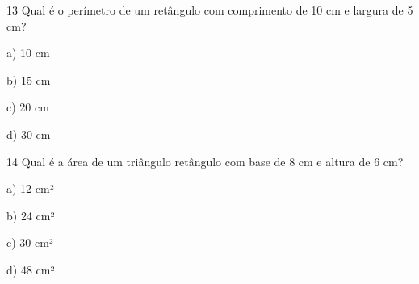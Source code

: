 
\num{13} Qual é o perímetro de um retângulo com comprimento de 10 cm e
largura de 5 cm?

a) 10 cm

b) 15 cm

c) 20 cm

d) 30 cm



\num{14} Qual é a área de um triângulo retângulo com base de 8 cm e altura de
6 cm?

a) 12 cm²

b) 24 cm²

c) 30 cm²

d) 48 cm²



